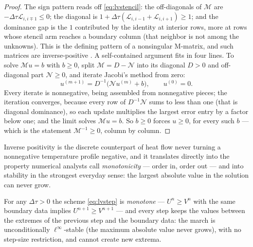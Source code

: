 \begin{proof}
The sign pattern reads off \eqref{eq:lvstencil}: the off-diagonals of
$\mathcal M$ are $-\Delta\tau\mathcal L_{i,i\mp1}\le0$; the diagonal is
$1+\Delta\tau(\mathcal L_{i,i-1}+\mathcal L_{i,i+1})\ge1$; and the
dominance gap is the $1$ contributed by the identity at interior rows,
more at rows whose stencil arm reaches a boundary column (that
neighbor is not among the unknowns).  This is the defining pattern of
a nonsingular M-matrix, and such matrices are inverse-positive
\citep{BermanPlemmons1994}.  A self-contained argument fits in four
lines.  To solve $\mathcal M u=b$ with $b\ge0$, split
$\mathcal M=D-\mathcal N$ into its diagonal $D>0$ and off-diagonal
part $\mathcal N\ge0$, and iterate Jacobi's method from zero:
\[
u^{(m+1)}=D^{-1}\big(\mathcal N u^{(m)}+b\big),\qquad u^{(0)}=0 .
\]
Every iterate is nonnegative, being assembled from nonnegative pieces;
the iteration converges, because every row of $D^{-1}\mathcal N$ sums
to less than one (that is diagonal dominance), so each update
multiplies the largest error entry by a factor below one; and the
limit solves $\mathcal M u=b$.  So
$b\ge0$ forces $u\ge0$, for every such $b$ --- which is the statement
$\mathcal M^{-1}\ge0$, column by column.
\end{proof}

Inverse positivity is the discrete counterpart of heat flow never
turning a nonnegative temperature profile negative, and it translates
directly into the property numerical
analysts call \emph{monotonicity} --- order in, order out --- and into
stability in the strongest everyday sense: the largest absolute value
in the solution can never grow.

\begin{corollary}
\label{cor:lvdmp}
For any $\Delta\tau>0$ the scheme \eqref{eq:lvstep} is \emph{monotone} ---
$U^{n}\ge V^{n}$ with the same boundary data implies $U^{n+1}\ge V^{n+1}$
--- and every step keeps the values between the extremes of the previous
step and the boundary data: the march is unconditionally
$\ell^{\infty}$-stable (the maximum absolute value never grows), with
no step-size restriction, and cannot create
new extrema.
\end{corollary}

